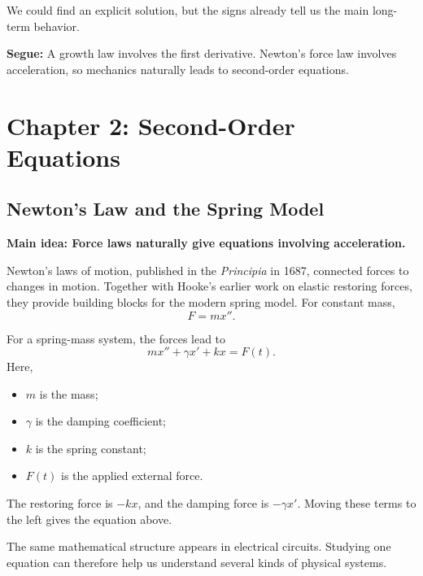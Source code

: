 \documentclass[11pt,letterpaper]{article}
\begin{document}
We could find an explicit solution, but the signs
already tell us the main long-term behavior.

\textbf{Segue:} A growth law involves the first
derivative. Newton's force law involves acceleration,
so mechanics naturally leads to second-order equations.


\section{Chapter 2: Second-Order Equations}


\subsection{Newton's Law and the Spring Model}

\textbf{Main idea: Force laws naturally give equations involving acceleration.}


Newton's laws of motion, published in the
\textit{Principia} in 1687, connected forces to
changes in motion. Together with Hooke's earlier
work on elastic restoring forces, they provide
building blocks for the modern spring model.
For constant mass,
\[
F=mx''.
\]

For a spring-mass system, the forces lead to
\[
\boxed{mx''+\gamma x'+kx=F(t).}
\]
Here,
\begin{itemize}
    \item $m$ is the mass;
    \item $\gamma$ is the damping coefficient;
    \item $k$ is the spring constant;
    \item $F(t)$ is the applied external force.
\end{itemize}

The restoring force is $-kx$, and the damping force
is $-\gamma x'$. Moving these terms to the left
gives the equation above.

The same mathematical structure appears in electrical
circuits. Studying one equation can therefore help us
understand several kinds of physical systems.
\end{document}

